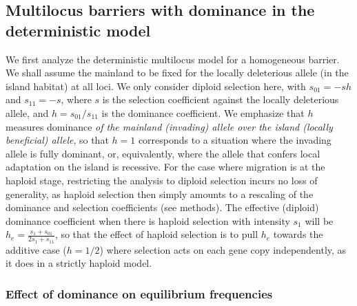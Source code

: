 \documentclass[
  11pt,
]{article}
\begin{document}
\hypertarget{multilocus-barriers-with-dominance-in-the-deterministic-model}{%
\subsection{Multilocus barriers with dominance in the deterministic
model}\label{multilocus-barriers-with-dominance-in-the-deterministic-model}}

We first analyze the deterministic multilocus model for a homogeneous
barrier. We shall assume the mainland to be fixed for the locally
deleterious allele (in the island habitat) at all loci. We only consider
diploid selection here, with \(s_{01} = -sh\) and \(s_{11} = -s\), where
\(s\) is the selection coefficient against the locally deleterious
allele, and \(h=s_{01}/s_{11}\) is the dominance coefficient. We
emphasize that \(h\) measures dominance \emph{of the mainland (invading)
allele over the island (locally beneficial) allele}, so that \(h=1\)
corresponds to a situation where the invading allele is fully dominant,
or, equivalently, where the allele that confers local adaptation on the
island is recessive. For the case where migration is at the haploid
stage, restricting the analysis to diploid selection incurs no loss of
generality, as haploid selection then simply amounts to a rescaling of
the dominance and selection coefficients (see methods). The effective
(diploid) dominance coefficient when there is haploid selection with
intensity \(s_1\) will be \(h_e = \frac{s_1+s_{01}}{2s_1+s_{11}}\), so
that the effect of haploid selection is to pull \(h_e\) towards the
additive case (\(h=1/2\)) where selection acts on each gene copy
independently, as it does in a strictly haploid model.

\hypertarget{effect-of-dominance-on-equilibrium-frequencies}{%
\subsubsection{Effect of dominance on equilibrium
frequencies}\label{effect-of-dominance-on-equilibrium-frequencies}}
\end{document}
